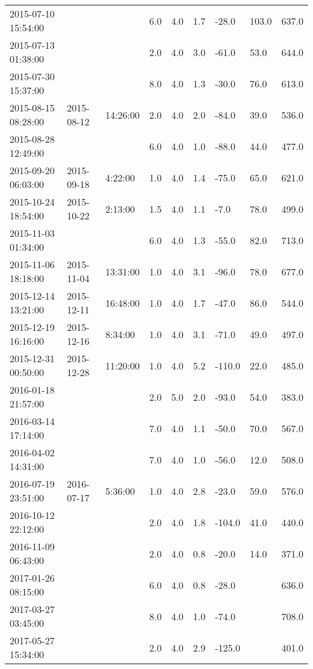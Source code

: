 \begin{longtable}{lllllllll}
        2015-07-10 15:54:00 & ~ & ~ & 6.0 & 4.0 & 1.7 & -28.0 & 103.0 & 637.0 \\ 
        2015-07-13 01:38:00 & ~ & ~ & 2.0 & 4.0 & 3.0 & -61.0 & 53.0 & 644.0 \\ 
        2015-07-30 15:37:00 & ~ & ~ & 8.0 & 4.0 & 1.3 & -30.0 & 76.0 & 613.0 \\ 
        2015-08-15 08:28:00 & 2015-08-12 & 14:26:00 & 2.0 & 4.0 & 2.0 & -84.0 & 39.0 & 536.0 \\ 
        2015-08-28 12:49:00 & ~ & ~ & 6.0 & 4.0 & 1.0 & -88.0 & 44.0 & 477.0 \\ 
        2015-09-20 06:03:00 & 2015-09-18 & 4:22:00 & 1.0 & 4.0 & 1.4 & -75.0 & 65.0 & 621.0 \\ 
        2015-10-24 18:54:00 & 2015-10-22 & 2:13:00 & 1.5 & 4.0 & 1.1 & -7.0 & 78.0 & 499.0 \\ 
        2015-11-03 01:34:00 & ~ & ~ & 6.0 & 4.0 & 1.3 & -55.0 & 82.0 & 713.0 \\ 
        2015-11-06 18:18:00 & 2015-11-04 & 13:31:00 & 1.0 & 4.0 & 3.1 & -96.0 & 78.0 & 677.0 \\ 
        2015-12-14 13:21:00 & 2015-12-11 & 16:48:00 & 1.0 & 4.0 & 1.7 & -47.0 & 86.0 & 544.0 \\ 
        2015-12-19 16:16:00 & 2015-12-16 & 8:34:00 & 1.0 & 4.0 & 3.1 & -71.0 & 49.0 & 497.0 \\ 
        2015-12-31 00:50:00 & 2015-12-28 & 11:20:00 & 1.0 & 4.0 & 5.2 & -110.0 & 22.0 & 485.0 \\ 
        2016-01-18 21:57:00 & ~ & ~ & 2.0 & 5.0 & 2.0 & -93.0 & 54.0 & 383.0 \\ 
        2016-03-14 17:14:00 & ~ & ~ & 7.0 & 4.0 & 1.1 & -50.0 & 70.0 & 567.0 \\ 
        2016-04-02 14:31:00 & ~ & ~ & 7.0 & 4.0 & 1.0 & -56.0 & 12.0 & 508.0 \\ 
        2016-07-19 23:51:00 & 2016-07-17 & 5:36:00 & 1.0 & 4.0 & 2.8 & -23.0 & 59.0 & 576.0 \\ 
        2016-10-12 22:12:00 & ~ & ~ & 2.0 & 4.0 & 1.8 & -104.0 & 41.0 & 440.0 \\ 
        2016-11-09 06:43:00 & ~ & ~ & 2.0 & 4.0 & 0.8 & -20.0 & 14.0 & 371.0 \\ 
        2017-01-26 08:15:00 & ~ & ~ & 6.0 & 4.0 & 0.8 & -28.0 & ~ & 636.0 \\ 
        2017-03-27 03:45:00 & ~ & ~ & 8.0 & 4.0 & 1.0 & -74.0 & ~ & 708.0 \\ 
        2017-05-27 15:34:00 & ~ & ~ & 2.0 & 4.0 & 2.9 & -125.0 & ~ & 401.0 \\ 

\end{longtable}
